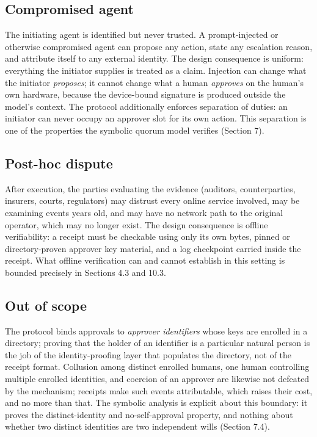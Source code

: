 \documentclass[11pt]{article}
\begin{document}
\subsection{Compromised agent}

The initiating agent is identified but never trusted. A prompt-injected or
otherwise compromised agent can propose any action, state any escalation reason,
and attribute itself to any external identity. The design consequence is uniform:
everything the initiator supplies is treated as a claim. Injection can change what
the initiator \emph{proposes}; it cannot change what a human \emph{approves} on
the human's own hardware, because the device-bound signature is produced outside
the model's context. The protocol additionally enforces separation of duties: an
initiator can never occupy an approver slot for its own action. This separation is
one of the properties the symbolic quorum model verifies (Section 7).

\subsection{Post-hoc dispute}

After execution, the parties evaluating the evidence (auditors, counterparties,
insurers, courts, regulators) may distrust every online service involved, may be
examining events years old, and may have no network path to the original
operator, which may no longer exist. The design consequence is offline
verifiability: a receipt must be checkable using only its own bytes, pinned or
directory-proven approver key material, and a log checkpoint carried inside the
receipt. What offline verification can and cannot establish in this setting is
bounded precisely in Sections 4.3 and 10.3.

\subsection{Out of scope}

The protocol binds approvals to \emph{approver identifiers} whose keys are
enrolled in a directory; proving that the holder of an identifier is a particular
natural person is the job of the identity-proofing layer that populates the
directory, not of the receipt format. Collusion among distinct enrolled humans,
one human controlling multiple enrolled identities, and coercion of an approver
are likewise not defeated by the mechanism; receipts make such events
attributable, which raises their cost, and no more than that. The symbolic
analysis is explicit about this boundary: it proves the distinct-identity and
no-self-approval property, and nothing about whether two distinct identities are
two independent wills (Section 7.4).
\end{document}
